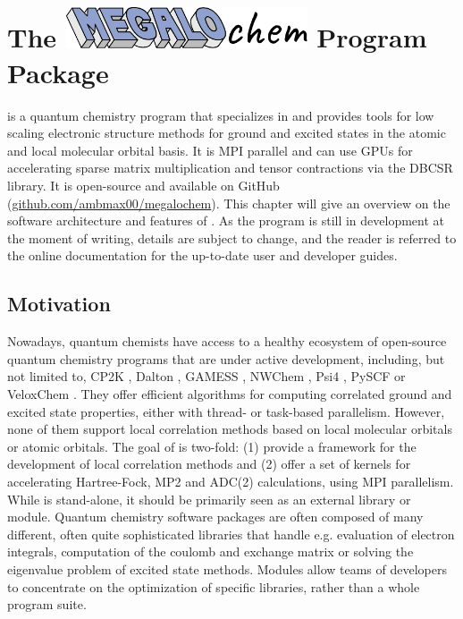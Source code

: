 \chapter[The \mchem Program Package]{The \protect\includegraphics[height=34pt]{Pics/MEGALOCHEM.pdf} Program Package}


\mchem{} is a quantum chemistry program that specializes in and provides tools for low scaling electronic structure methods for ground and excited states in the atomic and local molecular orbital basis. It is  MPI parallel and can use GPUs for accelerating sparse matrix multiplication and tensor contractions via the DBCSR library. It is open-source and available on GitHub (\url{github.com/ambmax00/megalochem}). This chapter will give an overview on the software architecture and features of \mchem{}. As the program is still in development at the moment of writing, details are subject to change, and the reader is referred to the online documentation for the up-to-date user and developer guides.

\section{Motivation}

Nowadays, quantum chemists have access to a healthy ecosystem of open-source quantum chemistry programs that are under active development, including, but not limited to, CP2K \cite{Hut2014}, Dalton \cite{Aid2014}, GAMESS \cite{Gor2005}, NWChem \cite{Val2010}, Psi4 \cite{Tur2012}, PySCF \cite{Sun2018} or VeloxChem \cite{Rin2020}. They offer efficient algorithms for computing correlated ground and excited state properties, either with thread- or task-based parallelism. However, none of them support local correlation methods based on local molecular orbitals or atomic orbitals. The goal of \mchem{} is two-fold: (1) provide a framework for the development of local correlation methods and (2) offer a set of kernels for accelerating Hartree-Fock, MP2 and ADC(2) calculations, using MPI parallelism. While \mchem{} is stand-alone, it should be primarily seen as an external library or module. Quantum chemistry software packages are often composed of many different, often quite sophisticated libraries that handle e.g. evaluation of electron integrals, computation of the coulomb and exchange matrix or solving the eigenvalue problem of excited state methods. Modules allow teams of developers to concentrate on the optimization of specific libraries, rather than a whole program suite. %

